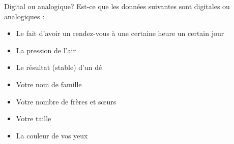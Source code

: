 \begin{exercice}
  \begin{exercicelet}{Digital ou analogique?}
    Est-ce que les données suivantes sont digitales ou analogiques :
    \begin{itemize}
    \item Le fait d'avoir un rendez-vous à une certaine heure un certain jour
    \item La pression de l'air
    \item Le résultat (stable) d'un dé
    \item Votre nom de famille
    \item Votre nombre de frères et sœurs
    \item Votre taille
    \item La couleur de vos yeux
    \end{itemize}
  \end{exercicelet}
\end{exercice}
